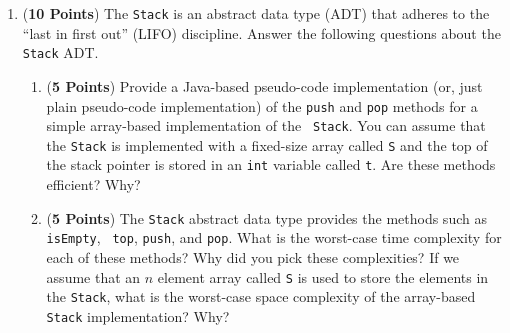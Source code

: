 \documentclass[12pt]{article}
\begin{document}
\begin{enumerate}
\begin{enumerate}

        \end{enumerate}

        \newpage

      \item ({\bf 10 Points}) The {\tt Stack} is an abstract data type (ADT)
        that adheres to the ``last in first out'' (LIFO) discipline.  Answer
        the following questions about the {\tt Stack} ADT.

        \begin{enumerate}

          \item ({\bf 5 Points}) Provide a Java-based pseudo-code implementation (or, just plain pseudo-code
            implementation) of the {\tt push} and {\tt pop} methods for a simple array-based implementation of the {\tt
            Stack}.  You can assume that the {\tt Stack} is implemented with a fixed-size array called {\tt S} and the
            top of the stack pointer is stored in an {\tt int} variable called {\tt t}. Are these methods efficient?
            Why?

          \item ({\bf 5 Points}) The {\tt Stack} abstract data type provides the methods such as {\tt isEmpty}, {\tt
            top}, {\tt push}, and {\tt pop}.  What is the worst-case time complexity for each of these methods?  Why did
            you pick these complexities? If we assume that an $n$ element array called {\tt S} is used to store the
            elements in the {\tt Stack}, what is the worst-case space complexity of the array-based {\tt Stack}
            implementation? Why?


        \end{enumerate}


\end{enumerate}
\end{document}
